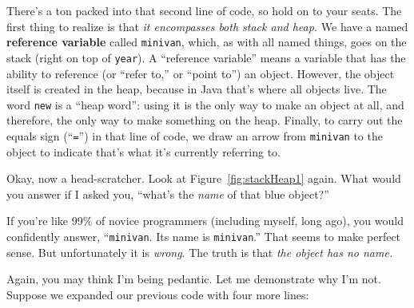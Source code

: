 There's a ton packed into that second line of code, so hold on to your seats.
The first thing to realize is that \textit{it encompasses both stack and
heap.} We have a named \textbf{reference variable} called \texttt{minivan},
which, as with all named things, goes on the stack (right on top of
\texttt{year}). A ``reference variable'' means a variable that has the ability
to reference (or ``refer to,'' or ``point to'') an object. However, the object
itself is created in the heap, because in Java that's where all objects live.
The word \texttt{new} is a ``heap word'': using it is the only way to make an
object at all, and therefore, the only way to make something on the heap.
Finally, to carry out the equals sign (``\texttt{=}'') in that line of code, we
draw an arrow from \texttt{minivan} to the object to indicate that's what it's
currently referring to.

%
%

Okay, now a head-scratcher. Look at Figure~\ref{fig:stackHeap1} again. What
would you answer if I asked you, ``what's the \textit{name} of that blue
object?''

If you're like 99\% of novice programmers (including myself, long ago), you
would confidently answer, ``\texttt{minivan}. Its name is \texttt{minivan}.''
That seems to make perfect sense. But unfortunately it is \textit{wrong}. The
truth is that \textit{the object has no name.}

Again, you may think I'm being pedantic. Let me demonstrate why I'm not.
Suppose we expanded our previous code with four more lines:

